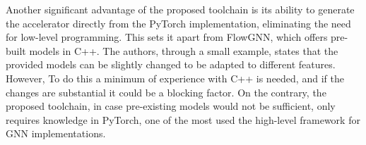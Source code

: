Another significant advantage of the proposed toolchain is its ability to generate the accelerator directly from the PyTorch implementation, eliminating the need for low-level programming.
This sets it apart from FlowGNN, which offers pre-built models in C++.
The authors, through a small example, states that the provided models can be slightly changed to be adapted to different features.
However, To do this a minimum of experience with C++ is needed, and if the changes are substantial it could be a blocking factor.
On the contrary, the proposed toolchain, in case pre-existing models would not be sufficient, only requires knowledge in PyTorch, one of the most used the high-level framework for GNN implementations.

